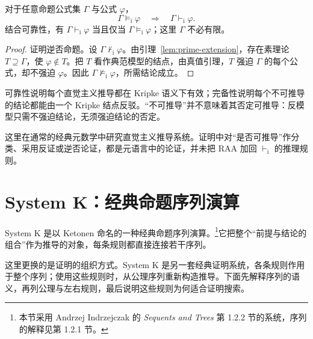 \documentclass[lang=cn,a4paper,fontset=none,zihao=false,10pt,openany,twoside]{beautybook}
\numberwithin{algorithm}{chapter}
\begin{document}
\begin{readingmaterial}[title={阅读材料：Kripke 语义},title after break={阅读材料：Kripke 语义（续）}]
\Needspace{70mm}
\begin{theorem}\label{thm:kripke-complete}
对于任意命题公式集 $\Gamma$ 与公式 $\varphi$，
\[
 \Gamma\models_{\mathrm i}\varphi
 \quad\Longrightarrow\quad
 \Gamma\vdash_{\mathrm i}\varphi.
\]
结合可靠性，有 $\Gamma\vdash_{\mathrm i}\varphi$ 当且仅当 $\Gamma\models_{\mathrm i}\varphi$；这里 $\Gamma$ 不必有限。
\end{theorem}
\begin{proof}
证明逆否命题。设 $\Gamma\nvdash_{\mathrm i}\varphi$。由引理~\ref{lem:prime-extension}，存在素理论 $T\supseteq\Gamma$，使 $\varphi\notin T$。把 $T$ 看作典范模型的结点，由真值引理，$T$ 强迫 $\Gamma$ 的每个公式，却不强迫 $\varphi$。因此 $\Gamma\not\models_{\mathrm i}\varphi$，所需结论成立。
\end{proof}

\begin{remark}
可靠性说明每个直觉主义推导都在 Kripke 语义下有效；完备性说明每个不可推导的结论都能由一个 Kripke 结点反驳。“不可推导”并不意味着其否定可推导：反模型只需不强迫结论，无须强迫结论的否定。

这里在通常的经典元数学中研究直觉主义推导系统。证明中对“是否可推导”作分类、采用反证或逆否论证，都是元语言中的论证，并未把 RAA 加回 $\vdash_{\mathrm i}$ 的推理规则。
\end{remark}

\end{readingmaterial}

\Needspace{180mm}
\section{System K：经典命题序列演算}\label{sec:system-k}
System K 是以 Ketonen 命名的一种经典命题序列演算。\footnote{本节采用 Andrzej Indrzejczak 的 \emph{Sequents and Trees} 第 1.2.2 节的系统，序列的解释见第 1.2.1 节。}它把整个“前提与结论的组合”作为推导的对象，每条规则都直接连接若干序列。

这里更换的是证明的组织方式。System K 是另一套经典证明系统，各条规则作用于整个序列；使用这些规则时，从公理序列重新构造推导。下面先解释序列的语义，再列公理与左右规则，最后说明这些规则为何适合证明搜索。
\end{document}
